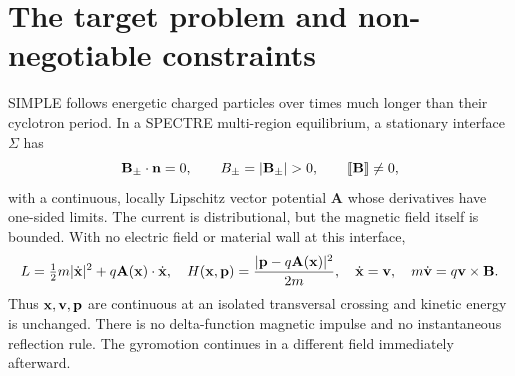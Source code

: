 \documentclass[10pt,a4paper]{article}
\newcommand{\B}{\mathbf B}\newcommand{\bunit}{\mathbf b}
\newcommand{\A}{\mathbf A}\newcommand{\dd}{\mathrm d}
\newcommand{\jump}[1]{[\![#1]\!]}
\begin{document}
\section{The target problem and non-negotiable constraints}
\label{sec:target}
SIMPLE follows energetic charged particles over times much longer than their cyclotron period. In a SPECTRE multi-region equilibrium, a stationary interface $\Sigma$ has
\begin{equation}
 \B_\pm\cdot\n=0,\qquad B_\pm=|\B_\pm|>0,
 \qquad \jump{\B}\ne0,
\end{equation}
with a continuous, locally Lipschitz vector potential $\A$ whose derivatives have one-sided limits. The current is distributional, but the magnetic field itself is bounded. With no electric field or material wall at this interface,
\begin{equation}\label{eq:fo}
 L=\tfrac12m|\dot\x|^2+q\A(\x)\cdot\dot\x,
 \quad H(\x,\p)=\frac{|\p-q\A(\x)|^2}{2m},
 \quad \dot\x=\v,\quad m\dot\v=q\v\times\B.
\end{equation}
Thus $\mathbf x,\mathbf v,\mathbf p$ are continuous at an isolated transversal crossing and kinetic energy is unchanged. There is no delta-function magnetic impulse and no instantaneous reflection rule. The gyromotion continues in a different field immediately afterward.
\end{document}
